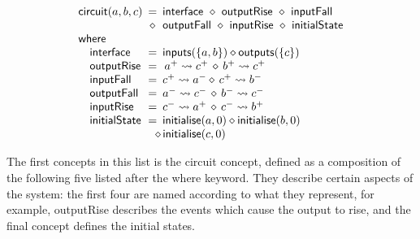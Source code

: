 \documentclass[british, journal]{IEEEtran}
\begin{document}
\vspace{-3mm}
\[
\begin{array}{lcl}
\mathsf{circuit}(a,b,c)&\hspace{-2mm}=&\hspace{-2mm}\mathsf{interface}~\diamond~\mathsf{outputRise}~\diamond~\mathsf{inputFall}\\
~&\hspace{-2mm}\diamond&\hspace{-2mm}\mathsf{outputFall}~\diamond~\mathsf{inputRise}~\diamond~\mathsf{initialState}\\
\mathsf{where}&~&\\
\,\,\,\,\,\,\mathsf{interface}&\hspace{-2mm}=&\hspace{-2mm}\mathsf{inputs}(\{a,b\})\diamond\mathsf{outputs}(\{c\})\\
\,\,\,\,\,\,\mathsf{outputRise}&\hspace{-2mm}=&\hspace{-2mm}\,a^{+}\rightsquigarrow c^{+}\,\diamond\, b^{+}\rightsquigarrow c^{+}\\
\,\,\,\,\,\,\mathsf{inputFall}&\hspace{-2mm}=&\hspace{-2mm}c ^ {+} \rightsquigarrow a^{-} \diamond\, c ^ {+} \rightsquigarrow b^{-}\\
\,\,\,\,\,\,\mathsf{outputFall}&\hspace{-2mm}=&\hspace{-2mm}a^{-} \rightsquigarrow c^{-} \,\diamond\, b^{-} \rightsquigarrow c^{-}\\
\,\,\,\,\,\,\mathsf{inputRise}&\hspace{-2mm}=&\hspace{-2mm}c^{-} \rightsquigarrow a^{+} \,\diamond\, c^{-} \rightsquigarrow b^{+}\\
\,\,\,\,\,\,\mathsf{initialState}&\hspace{-2mm}=&\hspace{-2mm}\mathsf{initialise}(a,0) \diamond \mathsf{initialise}(b,0) \\
&~&\hspace{-4.3mm}\diamond \, \mathsf{initialise}(c,0)\\
\end{array}
\]

The first concepts in this list is the \textsf{circuit} concept, defined as a
composition of the following five listed after the \textsf{where} keyword.
They describe certain aspects of the system: the first four are named
according to what they represent, for example, \textsf{outputRise} describes
the events which cause the output to rise, and the final concept defines
the initial states.
\end{document}

